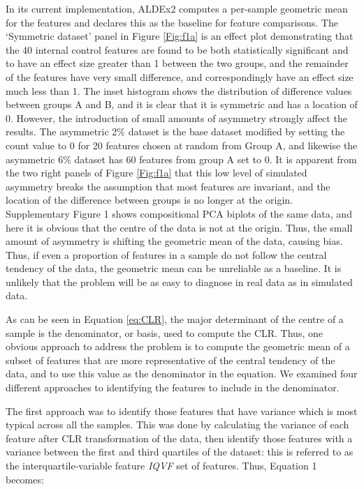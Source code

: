 \documentclass[10pt]{article}
\begin{document}
In its current implementation, ALDEx2 computes a per-sample geometric mean for the features and declares this as the baseline for feature comparisons. The `Symmetric dataset' panel in Figure \ref{Fig:f1a} is an effect plot demonstrating that the 40 internal control features are found to be both statistically significant and to have an effect size greater than 1 between the two groups, and the remainder of the features have very small difference, and correspondingly have an effect size much less than 1. The inset histogram shows the distribution of difference values between groups A and B, and it is clear that it is symmetric and has a location of 0. However, the introduction of small amounts of asymmetry strongly affect the results. The asymmetric 2\% dataset is the base dataset modified by setting the count value to 0 for 20 features chosen at random from Group A, and likewise the asymmetric 6\% dataset has 60 features from group A set to 0. It is apparent from the two right panels of Figure \ref{Fig:f1a} that this low level of simulated asymmetry breaks the assumption that most features are invariant, and the location of the difference between groups is no longer at the origin. Supplementary Figure 1 shows compositional PCA biplots of the same data, and here it is obvious that the centre of the data is not at the origin. Thus, the small amount of asymmetry is shifting the geometric mean of the data, causing bias. Thus, if even a proportion of features in a sample  do not follow the central tendency of the data, the geometric mean can be unreliable as a baseline. It is unlikely that the problem will be as easy to diagnose in real data as in simulated data. 

As can be seen in Equation \ref{eq:CLR}, the major determinant of the centre of a sample is the denominator, or basis, used to compute the CLR. Thus, one obvious approach to address the problem is to compute the geometric mean of a subset of features that are more representative of the central tendency of the data, and to use this value as the denominator in the equation. We  examined four different approaches to identifying the features to include in the denominator. 

The first approach was to identify those features that have variance which is most typical across all the samples. This was  done by calculating the variance of each feature after CLR transformation of the data, then identify  those features with a variance between the first and third quartiles of the dataset: this is referred to as the interquartile-variable feature \textit{IQVF} set of features. Thus, Equation 1 becomes:
\end{document}
